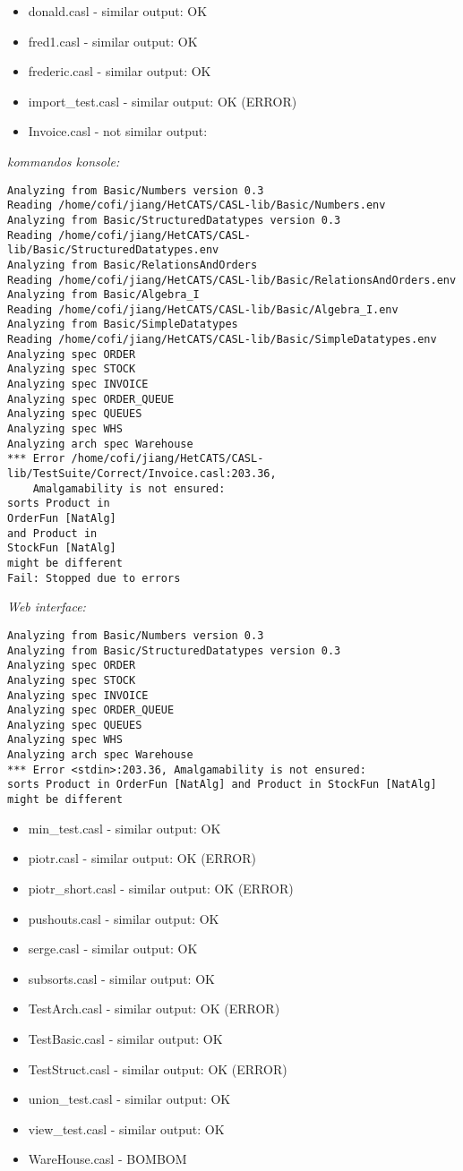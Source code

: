 \documentclass[11pt,a4paper]{article}
\begin{document}
\begin{itemize}
   \item donald.casl        - similar output: OK
   \item fred1.casl         - similar output: OK
   \item frederic.casl      - similar output: OK
   \item import\_test.casl  - similar output: OK (ERROR)
   \item Invoice.casl       - not similar output:
\end{itemize}
\textit{kommandos konsole:}
\begin{verbatim}
Analyzing from Basic/Numbers version 0.3
Reading /home/cofi/jiang/HetCATS/CASL-lib/Basic/Numbers.env
Analyzing from Basic/StructuredDatatypes version 0.3
Reading /home/cofi/jiang/HetCATS/CASL-lib/Basic/StructuredDatatypes.env
Analyzing from Basic/RelationsAndOrders
Reading /home/cofi/jiang/HetCATS/CASL-lib/Basic/RelationsAndOrders.env
Analyzing from Basic/Algebra_I
Reading /home/cofi/jiang/HetCATS/CASL-lib/Basic/Algebra_I.env
Analyzing from Basic/SimpleDatatypes
Reading /home/cofi/jiang/HetCATS/CASL-lib/Basic/SimpleDatatypes.env
Analyzing spec ORDER
Analyzing spec STOCK
Analyzing spec INVOICE
Analyzing spec ORDER_QUEUE
Analyzing spec QUEUES
Analyzing spec WHS
Analyzing arch spec Warehouse
*** Error /home/cofi/jiang/HetCATS/CASL-lib/TestSuite/Correct/Invoice.casl:203.36,
    Amalgamability is not ensured:
sorts Product in
OrderFun [NatAlg]
and Product in
StockFun [NatAlg]
might be different
Fail: Stopped due to errors
\end{verbatim}
\textit{Web interface:}
\begin{verbatim}
Analyzing from Basic/Numbers version 0.3
Analyzing from Basic/StructuredDatatypes version 0.3
Analyzing spec ORDER
Analyzing spec STOCK
Analyzing spec INVOICE
Analyzing spec ORDER_QUEUE
Analyzing spec QUEUES
Analyzing spec WHS
Analyzing arch spec Warehouse
*** Error <stdin>:203.36, Amalgamability is not ensured: 
sorts Product in OrderFun [NatAlg] and Product in StockFun [NatAlg] 
might be different
\end{verbatim}
\begin{itemize}
    \item min\_test.casl     - similar output: OK
    \item piotr.casl         - similar output: OK (ERROR)
    \item piotr\_short.casl  - similar output: OK (ERROR)
    \item pushouts.casl      - similar output: OK
    \item serge.casl         - similar output: OK
    \item subsorts.casl      - similar output: OK
    \item TestArch.casl      - similar output: OK (ERROR)
    \item TestBasic.casl     - similar output: OK
    \item TestStruct.casl    - similar output: OK (ERROR)
    \item union\_test.casl   - similar output: OK
    \item view\_test.casl    - similar output: OK
    \item WareHouse.casl     - BOMBOM
\end{itemize}
\end{document}
